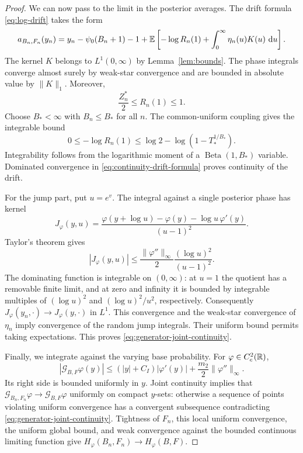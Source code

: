 \begin{proof}
We can now pass to the limit in the posterior averages.
The drift formula \eqref{eq:log-drift} takes the form
\begin{equation}
 a_{B_n,F_n}(y_n)
 =y_n-\psi_0(B_n+1)-1
   +\mathbb E\left[-\log R_n(1)
           +\int_0^\infty\eta_n(u)K(u)\,\mathop{}\!\mathrm d u\right].
 \label{eq:continuity-drift-formula}
\end{equation}
The kernel \(K\) belongs to \(L^1(0,\infty)\) by Lemma~\ref{lem:bounds}.
The phase integrals converge almost surely by weak-star convergence and are bounded in absolute value by \(\|K\|_1\).
Moreover,
\[
 \frac{Z_n^*}{2}\le R_n(1)\le1.
 \]
Choose \(B_*<\infty\) with \(B_n\le B_*\) for all \(n\).
The common-uniform coupling gives the integrable bound
\[
 0\le-\log R_n(1)
 \le\log2-\log(1-T_*^{1/B_*}).
 \]
Integrability follows from the logarithmic moment of a \(\operatorname{Beta}(1,B_*)\) variable.
Dominated convergence in \eqref{eq:continuity-drift-formula} proves continuity of the drift.

For the jump part, put \(u=e^v\).
The integral against a single posterior phase has kernel
\begin{equation}
 J_\varphi(y,u)
 =\frac{\varphi(y+\log u)-\varphi(y)
              -\log u\,\varphi'(y)}{(u-1)^2}.
 \label{eq:continuity-jump-kernel}
\end{equation}
Taylor's theorem gives
\[
 |J_\varphi(y,u)|
 \le\frac{\|\varphi''\|_\infty}{2}
                 \frac{(\log u)^2}{(u-1)^2}.
 \]
The dominating function is integrable on \((0,\infty)\): at \(u=1\) the quotient has a removable finite limit, and at zero and infinity it is bounded by integrable multiples of \((\log u)^2\) and \((\log u)^2/u^2\), respectively.
Consequently \(J_\varphi(y_n,\cdot)\to J_\varphi(y,\cdot)\) in \(L^1\).
This convergence and the weak-star convergence of \(\eta_n\) imply convergence of the random jump integrals.
Their uniform bound permits taking expectations.
This proves \eqref{eq:generator-joint-continuity}.

Finally, we integrate against the varying base probability.
For \(\varphi\in C_c^2(\mathbb R)\),
\begin{equation}
 |\mathcal G_{B,F}\varphi(y)|
 \le (|y|+C_I)|\varphi'(y)|
       +\frac{m_2}{2}\|\varphi''\|_\infty.
 \label{eq:compact-test-generator-bound}
\end{equation}
Its right side is bounded uniformly in \(y\).
Joint continuity implies that \(\mathcal G_{B_n,F_n}\varphi\to\mathcal G_{B,F}\varphi\) uniformly on compact \(y\)-sets: otherwise a sequence of points violating uniform convergence has a convergent subsequence contradicting \eqref{eq:generator-joint-continuity}.
Tightness of \(F_n\), this local uniform convergence, the uniform global bound, and weak convergence against the bounded continuous limiting function give \(H_\varphi(B_n,F_n)\to H_\varphi(B,F)\).
\end{proof}

